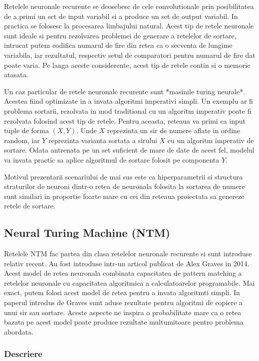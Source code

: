 \documentclass[12pt]{article}
\begin{document}
Retelele neuronale recurente se deosebesc de cele convolutionale prin posibilitatea de a primi un set de input variabil si a produce un set de output variabil. In practica se folosesc la procesarea limbajului natural. Acest tip de retele neuronale sunt ideale si pentru rezolvarea problemei de generare a retelelor de sortare, intrucat putem codifica numarul de fire din retea ca o secventa de lungime variabila, iar rezultatul, respectiv setul de comparatori pentru numarul de fire dat poate varia. Pe langa aceste considerente, acest tip de retele contin si o memorie atasata.

Un caz particular de retele neuronale recurente sunt *masinile turing neurale*. Acestea fiind optimizate in a invata algoritmi imperativi simpli. Un exemplu ar fi problema sortarii, rezolvata in mod traditional cu un algoritm imperativ poate fi rezolvata folosind acest tip de retele. Pentru aceasta, reteaua va primi ca input tuple de forma $(X, Y)$. Unde $X$ reprezinta un sir de numere aflate in ordine random, iar $Y$ reprezinta varianta sortata a sirului $X$ cu un algoritm imperativ de sortare. Odata antrenata pe un set suficient de mare de date de acest fel, modelul va invata practic sa aplice algoritmul de sortare folosit pe componenta $Y$. 

Motivul prezentarii scenariului de mai sus este ca hiperparametrii si structura straturilor de neuroni dintr-o retea de neuronala folosita la sortarea de numere sunt similari in proportie foarte mare cu cei din reteaua proiectata sa genereze retele de sortare.

\subsection{Neural Turing Machine (NTM)}

Retelele NTM fac partea din clasa retelelor neuronale recurente si sunt introduse relativ recent. Au fost introduse intr-un articol publicat de Alex Graves in 2014. Acest model de retea neuronala combinata capacitatea de pattern matching a retelelor neuronale cu capacitatea algoritmica a calculatoarelor programabile. Mai exact, putem folosi acest model de retea pentru a invata algoritmti simpli. In paperul introdus de Graves sunt aduse rezultate pentru algoritmi de copiere a unui sir sau sortare. Aceste aspecte ne inspira o probabilitate mare ca o retea bazata pe acest model poate produce rezultate multumitoare pentro problema abordata.

\subsubsection{Descriere}
\end{document}

